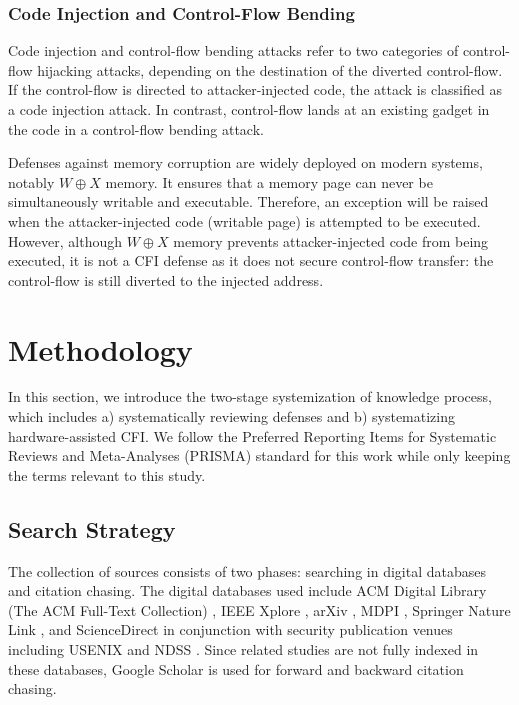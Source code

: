 \documentclass[journal,onecolumn]{IEEEtran}
\begin{document}
\subsubsection{Code Injection and Control-Flow Bending}

Code injection and control-flow bending attacks refer to two categories of control-flow hijacking attacks, depending on the destination of the diverted control-flow. If the control-flow is directed to attacker-injected code, the attack is classified as a code injection attack. In contrast, control-flow lands at an existing gadget in the code in a control-flow bending attack.

Defenses against memory corruption are widely deployed on modern systems, notably $W \oplus X$ memory. It ensures that a memory page can never be simultaneously writable and executable. Therefore, an exception will be raised when the attacker-injected code (writable page) is attempted to be executed. However, although $W\oplus X$ memory prevents attacker-injected code from being executed, it is not a CFI defense as it does not secure control-flow transfer: the control-flow is still diverted to the injected address.


\section{Methodology}

In this section, we introduce the two-stage systemization of knowledge process, which includes a) systematically reviewing defenses and b) systematizing hardware-assisted CFI. We follow the Preferred Reporting Items for Systematic
Reviews and Meta-Analyses (PRISMA) standard  for this work\cite{Page22} while only keeping the terms relevant to this study.

\subsection{Search Strategy}

The collection of sources consists of two phases: searching in digital databases and citation chasing. The digital databases used include ACM Digital Library (The ACM Full-Text Collection) \cite{ACMDLib}, IEEE Xplore \cite{IEEEXplore}, arXiv \cite{arXiv}, MDPI \cite{MDPI}, Springer Nature Link \cite{SpringerNature}, and ScienceDirect \cite{ScienceDirect} in conjunction with security publication venues including USENIX \cite{USENIX} and NDSS \cite{NDSS}. Since related studies are not fully indexed in these databases, Google Scholar \cite{GoogleScholar} is used for forward and backward citation chasing.
\end{document}
